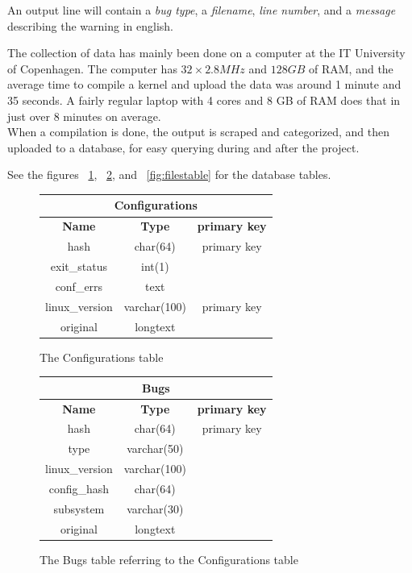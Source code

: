 \documentclass[a4paper,11pt]{report}
\newcommand{\figa}{
    \begin{figure}[!htpb]
    \centering
}
\newcommand{\figb}[2]{
    \caption{#1}
    \label{#2}
    \end{figure}
}
\begin{document}
An output line will contain a \emph{bug type}, a \emph{filename}, \emph{line 
number}, and a \emph{message} describing the warning in english.


The collection of data has mainly been done on a computer at the IT University 
of Copenhagen. The computer has $32\times2.8 MHz$ and $128 GB$ of RAM, and the 
average time to compile a kernel and upload the data was around 1 minute and 35 
seconds. A fairly regular laptop with 4 cores and 8 GB of RAM does that in just 
over 8 minutes on average. 
\\


When a compilation is done, the output is scraped and categorized, and then 
uploaded to a database, for easy querying during and after the project. 

See the figures ~\ref{fig:conftable}, ~\ref{fig:bugstable}, and 
~\ref{fig:filestable} for the database tables.


\figa
    \begin{tabular}{c|c|c}
        \hline 
        \hline
        \multicolumn{3}{c}{\textbf{Configurations}} \\
        \hline
        \textbf{Name} & \textbf{Type} &\textbf{primary key} \\
        \hline
        hash & char(64) & primary key \\
        exit\_status & int(1) \\
        conf\_errs & text \\
        linux\_version & varchar(100) & primary key \\
        original & longtext \\
        \hline
        \hline
    \end{tabular}
\figb{The Configurations table}{fig:conftable}

\figa
    \begin{tabular}{c|c|c}
        \hline
        \hline
        \multicolumn{3}{c}{\textbf{Bugs}} \\
        \hline
        \textbf{Name} & \textbf{Type} &\textbf{primary key} \\
        \hline
        hash & char(64) & primary key \\
        type & varchar(50) \\
        linux\_version & varchar(100) \\
        config\_hash & char(64) \\
        subsystem & varchar(30) \\
        original & longtext \\
        \hline
        \hline
    \end{tabular}
\figb{The Bugs table referring to the Configurations table}{fig:bugstable}
\end{document}
